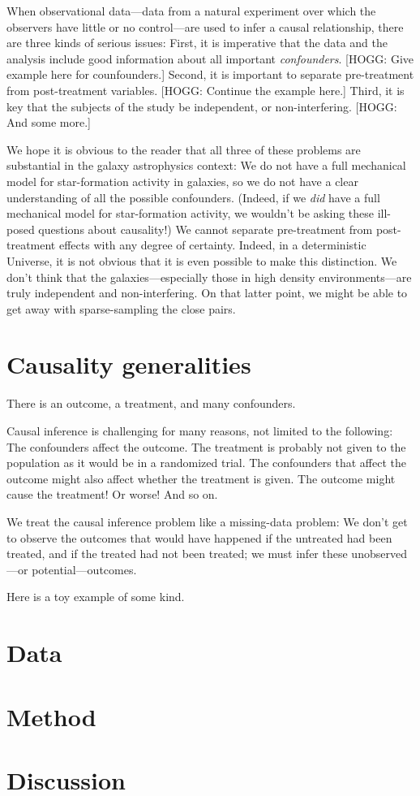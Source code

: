 \documentclass[12pt, letterpaper, preprint]{aastex}
\begin{document}
When observational data---data from a natural experiment over which
the observers have little or no control---are used to infer a causal
relationship, there are three kinds of serious issues:
First, it is imperative that the data and the analysis include good
information about all important \emph{confounders}.
[HOGG: Give example here for counfounders.]
Second, it is important to separate pre-treatment from post-treatment
variables.
[HOGG: Continue the example here.]
Third, it is key that the subjects of the study be independent, or
non-interfering.
[HOGG: And some more.]

We hope it is obvious to the reader that all three of these problems
are substantial in the galaxy astrophysics context:
We do not have a full mechanical model for star-formation activity in
galaxies, so we do not have a clear understanding of all the possible
confounders.
(Indeed, if we \emph{did} have a full mechanical model for
star-formation activity, we wouldn't be asking these ill-posed
questions about causality!)
We cannot separate pre-treatment from post-treatment effects with any
degree of certainty.
Indeed, in a deterministic Universe, it is not obvious that it is even
possible to make this distinction.
We don't think that the galaxies---especially those in high density
environments---are truly independent and non-interfering.
On that latter point, we might be able to get away with
sparse-sampling the close pairs.

\section{Causality generalities}

There is an outcome, a treatment, and many confounders.

Causal inference is challenging for many reasons, not limited to the following:
The confounders affect the outcome.
The treatment is probably not given to the population as it would be in a randomized trial.
The confounders that affect the outcome might also affect whether the treatment is given.
The outcome might cause the treatment!  Or worse!
And so on.

We treat the causal inference problem like a missing-data problem:
We don't get to observe the outcomes that would have happened if the untreated had been treated,
and if the treated had not been treated;
we must infer these unobserved---or potential---outcomes.

Here is a toy example of some kind.

\section{Data}

\section{Method}

\section{Discussion}
\end{document}

